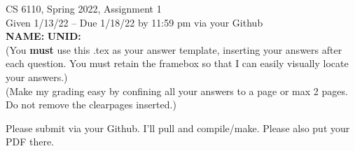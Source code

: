\documentclass[11pt]{article}
\begin{document}



\begin{center}
\begin{large}
  CS 6110, Spring 2022, Assignment 1  \\
  Given 1/13/22 -- Due 1/18/22 by 11:59 pm via your Github 
  \ \\
    {  {\Large\bf NAME: } \hfill {\Large\bf UNID: }\hspace{4cm} }
          \ \\
          (You {\bf must} use this .tex as your answer template, inserting your answers
          after each question. You must retain the framebox so that I can easily visually
          locate your answers.)
          \ \\
          (Make my grading easy by confining all your answers to a page or max 2 pages.
          Do not remove the clearpages inserted.)
  \ \\      
\end{large}


\end{center}
\date{}


 Please submit 
via your Github. I'll pull and compile/make.
%
Please also put your PDF there. 

\end{document}

